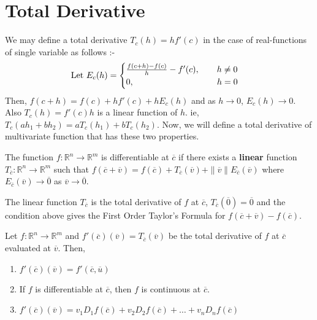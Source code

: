 \section{Total Derivative}
	We may define a total derivative \( T_c(h) = hf'(c) \) in the case of real-functions of single variable as follows :-\\

	\[ \text{Let }E_c(h) = \begin{cases} \frac{f(c+h)-f(c)}{h} - f'(c),\qquad h \ne 0 \\ 0,\hspace{3.4cm} h = 0 \end{cases} \]
		Then, \( f(c+h) = f(c) + hf'(c) + hE_c(h) \) and as \( h \to 0 \), \( E_c(h) \to 0\). Also \( T_c(h) = f'(c)h \) is a linear function of $h$. ie, \( T_c(ah_1+bh_2) = aT_c(h_1)+bT_c(h_2) \). Now, we will define a total derivative of multivariate function that has these two properties.

\begin{definition}
	The function \( f: \mathbb{R}^n \to \mathbb{R}^m \) is differentiable at $\overline{c}$ if there exists a \textbf{linear} function \( T_{\overline{c}} : \mathbb{R}^n \to \mathbb{R}^m \) such that \( f(\overline{c}+\overline{v}) = f(\overline{c}) + T_{\overline{c}}(\overline{v}) + \|\overline{v}\| E_{\overline{c}}(\overline{v}) \) where \( E_{\overline{c}}(\overline{v}) \to \overline{0} \) as \( \overline{v} \to \overline{0} \).
\end{definition}

	The linear function $T_{\overline{c}}$ is the total derivative of $f$ at $\overline{c}$, \( T_{\overline{c}}(\overline{0}) = \overline{0} \) and the condition above gives the First Order Taylor's Formula for \( f(\overline{c}+\overline{v})-f(\overline{c}) \).

\begin{remark}[Properties] Let \( f : \mathbb{R}^n \to \mathbb{R}^m \) and \( f'(\overline{c})(\overline{v}) = T_{\overline{c}}(\overline{v}) \) be the total derivative of $f$ at $\overline{c}$ evaluated at $\overline{v}$. Then, 
	\begin{enumerate}
		\item \( f'(\overline{c})(\overline{v}) = f'(\overline{c},\overline{u}) \)
		\item If $f$ is differentiable at $\overline{c}$, then $f$ is continuous at $\overline{c}$.
		\item \( f'(\overline{c})(\overline{v}) = v_1 D_1 f(\overline{c}) + v_2 D_2 f(\overline{c}) + \dots + v_n D_n f(\overline{c}) \)
	\end{enumerate}
\end{remark}

